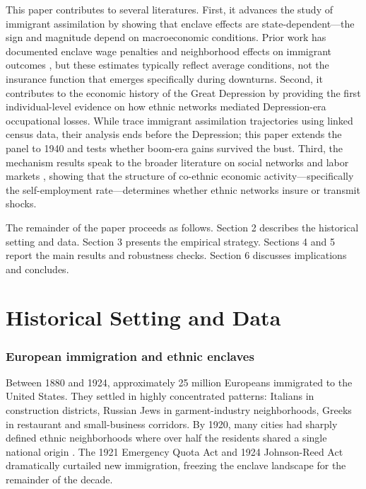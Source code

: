 \documentclass[12pt]{article}
\begin{document}
This paper contributes to several literatures. First, it advances the study of immigrant assimilation by showing that enclave effects are state-dependent---the sign and magnitude depend on macroeconomic conditions. Prior work has documented enclave wage penalties \citep{borjas1995} and neighborhood effects on immigrant outcomes \citep{cutler2008}, but these estimates typically reflect average conditions, not the insurance function that emerges specifically during downturns. Second, it contributes to the economic history of the Great Depression by providing the first individual-level evidence on how ethnic networks mediated Depression-era occupational losses. While \citet{abramitzky2014} trace immigrant assimilation trajectories using linked census data, their analysis ends before the Depression; this paper extends the panel to 1940 and tests whether boom-era gains survived the bust. Third, the mechanism results speak to the broader literature on social networks and labor markets \citep{munshi2003,beaman2012}, showing that the structure of co-ethnic economic activity---specifically the self-employment rate---determines whether ethnic networks insure or transmit shocks.

The remainder of the paper proceeds as follows. Section 2 describes the historical setting and data. Section 3 presents the empirical strategy. Sections 4 and 5 report the main results and robustness checks. Section 6 discusses implications and concludes.


\section{Historical Setting and Data}

\subsubsection*{European immigration and ethnic enclaves} Between 1880 and 1924, approximately 25 million Europeans immigrated to the United States. They settled in highly concentrated patterns: Italians in construction districts, Russian Jews in garment-industry neighborhoods, Greeks in restaurant and small-business corridors. By 1920, many cities had sharply defined ethnic neighborhoods where over half the residents shared a single national origin \citep{abramitzky2021}. The 1921 Emergency Quota Act and 1924 Johnson-Reed Act dramatically curtailed new immigration, freezing the enclave landscape for the remainder of the decade.
\end{document}
